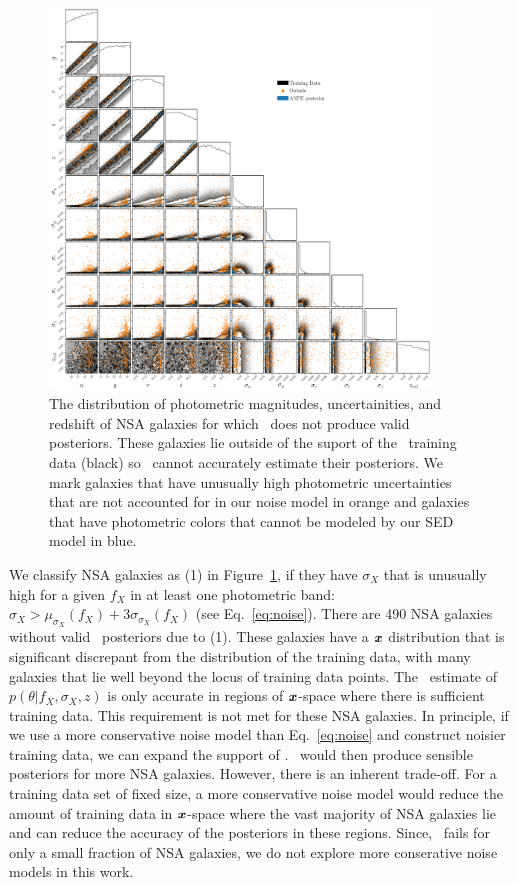 \begin{figure}
\begin{center}
    \includegraphics[width=0.9\textwidth]{figs/fails.pdf}
    \caption{\label{fig:fail}
    The distribution of photometric magnitudes, uncertainities, and redshift of
    NSA galaxies for which \sedflow~does not produce valid posteriors. 
    These galaxies lie outside of the suport of the \sedflow~training data
    (black) so \sedflow~cannot accurately estimate their posteriors. 
    We mark galaxies that have unusually high photometric uncertainties
    that are not accounted for in our noise model in orange and galaxies that
    have photometric colors that cannot be modeled by our SED model in blue. 
    }
\end{center}
\end{figure}
We classify NSA galaxies as (1) in Figure~\ref{fig:fail}, if they have
$\sigma_X$ that is unusually high for a given $f_X$ in at least one photometric
band: $\sigma_X > \mu_{\sigma_X}(f_X) + 3 \sigma_{\sigma_X}(f_X)$
(see Eq.~\ref{eq:noise}). 
There are 490 NSA galaxies without valid \sedflow~posteriors due to (1).
These galaxies have a $\textbf{\textit{x}}$ distribution that is significant discrepant
from the distribution of the training data, with many galaxies that lie well
beyond the locus of training data points. 
The \sedflow~estimate of $p(\theta | f_X, \sigma_X, z)$ is only accurate in
regions of $\textbf{\textit{x}}$-space where there is sufficient training data. 
This requirement is not met for these NSA galaxies.  
In principle, if we use a more conservative noise model than Eq.~\ref{eq:noise}
and construct noisier training data, we can expand the support of \sedflow. 
\sedflow~would then produce sensible posteriors for more NSA galaxies. 
However, there is an inherent trade-off. 
For a training data set of fixed size, a more conservative noise model would
reduce the amount of training data in $\textbf{\textit{x}}$-space where the vast majority
of NSA galaxies lie and can reduce the accuracy of the posteriors in these
regions. 
Since, \sedflow~fails for only a small fraction of NSA galaxies, we do not
explore more conserative noise models in this work.

